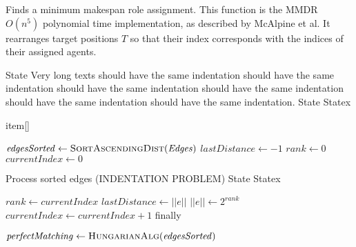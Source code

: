 \documentclass[notitlepage,english]{hgbreport}
\begin{document}



\begin{algorithm}	 %
\caption{Finds a minimum makespan role assignment. This function is the MMDR $O(n^5)$ polynomial time implementation, as described by McAlpine et al. It rearranges target positions $T$ so that their index corresponds with the indices of their assigned agents.}
\label{alg:mmdr}
\begin{algorithmic}[1]%
%
%
\State State Very long texts should have the same indentation should have the same indentation 
should have the same indentation should have the same indentation should have the same indentation 
should have the same indentation.
\State State 
\Statex Statex

\item[] item[]

\State $\mathit{edgesSorted} \gets \Call{SortAscendingDist}{\mathit{Edges}}$
\State $\mathit{lastDistance} \gets -1$
\State $\mathit{rank} \gets 0$
\State$\mathit{currentIndex} \gets 0$


\Statex Process sorted edges (INDENTATION PROBLEM)
		\State State
		\Statex Statex 
		
		\State$\mathit{rank} \gets \mathit{currentIndex}$ 
	\EndIf
	\State$\mathit{lastDistance} \gets ||e||$ 
	\State$||e|| \gets 2^{\mathit{rank}}$
	\State$\mathit{currentIndex} \gets \mathit{currentIndex} + 1$
	\State finally
\EndFor

\State $\mathit{perfectMatching} \gets \Call{HungarianAlg}{\mathit{edgesSorted}}$ 
\EndProcedure
\end{algorithmic}
 \end{algorithm}
\end{document}
